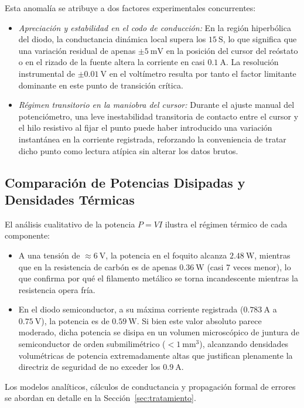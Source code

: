 Esta anomalía se atribuye a dos factores experimentales concurrentes:
\begin{itemize}
    \item \textit{Apreciación y estabilidad en el codo de conducción:} En la región hiperbólica del diodo, la conductancia dinámica local supera los $\qty{15}{\siemens}$, lo que significa que una variación residual de apenas $\pm\qty{5}{\milli\volt}$ en la posición del cursor del reóstato o en el rizado de la fuente altera la corriente en casi $\qty{0,1}{\ampere}$. La resolución instrumental de $\pm\qty{0,01}{\volt}$ en el voltímetro resulta por tanto el factor limitante dominante en este punto de transición crítica.
    \item \textit{Régimen transitorio en la maniobra del cursor:} Durante el ajuste manual del potenciómetro, una leve inestabilidad transitoria de contacto entre el cursor y el hilo resistivo al fijar el punto puede haber introducido una variación instantánea en la corriente registrada, reforzando la conveniencia de tratar dicho punto como lectura atípica sin alterar los datos brutos.
\end{itemize}

\subsection{Comparación de Potencias Disipadas y Densidades Térmicas}
El análisis cualitativo de la potencia $P = V I$ ilustra el régimen térmico de cada componente:
\begin{itemize}
    \item A una tensión de $\approx\qty{6}{\volt}$, la potencia en el foquito alcanza $\qty{2,48}{\watt}$, mientras que en la resistencia de carbón es de apenas $\qty{0,36}{\watt}$ (casi 7 veces menor), lo que confirma por qué el filamento metálico se torna incandescente mientras la resistencia opera fría.
    \item En el diodo semiconductor, a su máxima corriente registrada ($\qty{0,783}{\ampere}$ a $\qty{0,75}{\volt}$), la potencia es de $\qty{0,59}{\watt}$. Si bien este valor absoluto parece moderado, dicha potencia se disipa en un volumen microscópico de juntura de semiconductor de orden submilimétrico ($< \qty{1}{\milli\meter\cubed}$), alcanzando densidades volumétricas de potencia extremadamente altas que justifican plenamente la directriz de seguridad de no exceder los $\qty{0,9}{\ampere}$.
\end{itemize}

Los modelos analíticos, cálculos de conductancia y propagación formal de errores se abordan en detalle en la Sección~\ref{sec:tratamiento}.
